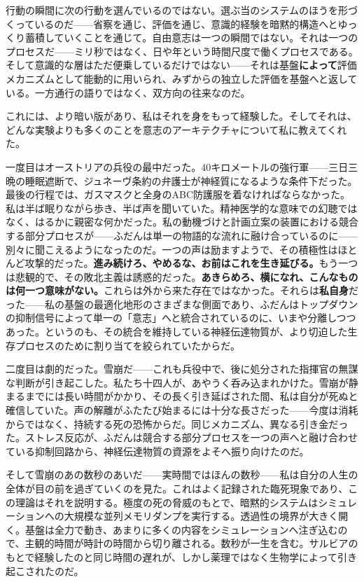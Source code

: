 \documentclass[11pt, twoside, openright]{book}
\begin{document}
行動の瞬間に次の行動を選んでいるのではない。選ぶ当のシステムのほうを形づくっているのだ------省察を通じ、評価を通じ、意識的経験を暗黙的構造へとゆっくり蓄積していくことを通じて。自由意志は一つの瞬間ではない。それは一つのプロセスだ------ミリ秒ではなく、日や年という時間尺度で働くプロセスである。そして意識的な層はただ便乗しているだけではない------それは基盤\textbf{によって}評価メカニズムとして能動的に用いられ、みずからの独立した評価を基盤へと返している。一方通行の語りではなく、双方向の往来なのだ。

これには、より暗い版があり、私はそれを身をもって経験した。そしてそれは、どんな実験よりも多くのことを意志のアーキテクチャについて私に教えてくれた。

一度目はオーストリアの兵役の最中だった。40キロメートルの強行軍------三日三晩の睡眠遮断で、ジュネーヴ条約の弁護士が神経質になるような条件下だった。最後の行程では、ガスマスクと全身のABC防護服を着なければならなかった。私は半ば眠りながら歩き、半ば声を聞いていた。精神医学的な意味での幻聴ではなく、はるかに親密な何かだった。私の動機づけと計画立案の装置における競合する部分プロセスが------ふだんは単一の物語的な流れに融け合っているのに------別々に聞こえるようになったのだ。一つの声は励ますようで、その積極性はほとんど攻撃的だった。\textbf{進み続けろ、やめるな、お前はこれを生き延びる。}もう一つは悲観的で、その敗北主義は誘惑的だった。\textbf{あきらめろ、横になれ、こんなものは何一つ意味がない。}これらは外から来た存在ではなかった。それらは\textbf{私自身}だった------私の基盤の最適化地形のさまざまな側面であり、ふだんはトップダウンの抑制信号によって単一の「意志」へと統合されているのに、いまや分離しつつあった。というのも、その統合を維持している神経伝達物質が、より切迫した生存プロセスのために割り当てを絞られていたからだ。

二度目は劇的だった。雪崩だ------これも兵役中で、後に処分された指揮官の無謀な判断が引き起こした。私たち十四人が、あやうく呑み込まれかけた。雪崩が静まるまでには長い時間がかかり、その長く引き延ばされた間、私は自分が死ぬと確信していた。声の解離がふたたび始まるには十分な長さだった------今度は消耗からではなく、持続する死の恐怖からだ。同じメカニズム、異なる引き金だった。ストレス反応が、ふだんは競合する部分プロセスを一つの声へと融け合わせている抑制回路から、神経伝達物質の資源をよそへ振り向けたのだ。

そして雪崩のあの数秒のあいだ------実時間ではほんの数秒------私は自分の人生の全体が目の前を過ぎていくのを見た。これはよく記録された臨死現象であり、この理論はそれを説明する。極度の死の脅威のもとで、暗黙的システムはシミュレーションへの大規模な並列メモリダンプを実行する。透過性の境界が大きく開く。基盤は全力で動き、あまりに多くの内容をシミュレーションへ注ぎ込むので、主観的時間が時計の時間から切り離される。数秒が一生を含む。サルビアのもとで経験したのと同じ時間の遅れが、しかし薬理ではなく生物学によって引き起こされたのだ。
\end{document}
